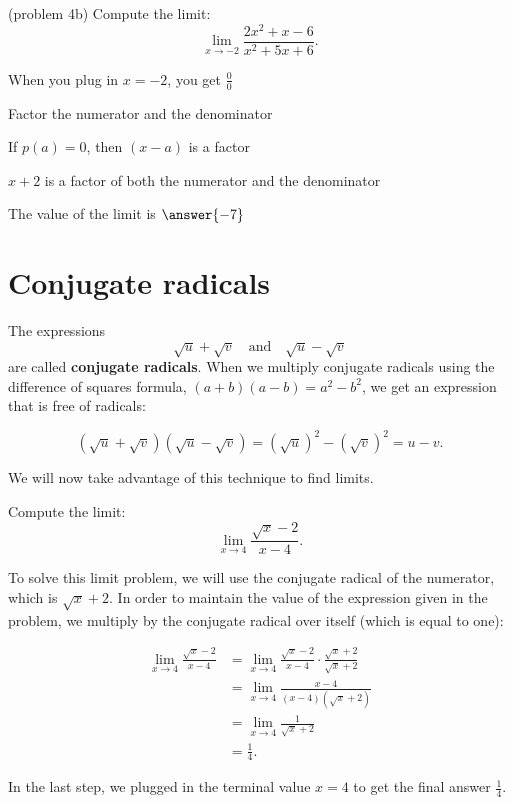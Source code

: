 \documentclass[handout]{ximera}
\begin{document}
\begin{problem}(problem 4b)
  Compute the limit:
  \[
  \lim_{x \to -2} \frac{2x^2 + x - 6}{x^2 + 5x + 6}.
  \]
  
    \begin{hint}
      When you plug in $x = -2$, you get $\frac00$
    \end{hint}
    \begin{hint}
      Factor the numerator and the denominator
    \end{hint}
    \begin{hint}
      If $p(a) = 0$, then $(x-a)$ is a factor
    \end{hint}
    \begin{hint}
      $x+2$ is a factor of both the numerator and the denominator
    \end{hint}
    
		The value of the limit is
		 $\answer{-7}$
		
\end{problem}


\section{Conjugate radicals}


The expressions 
\[\sqrt u + \sqrt v \quad \text{and} \quad \sqrt u - \sqrt v\]
 are called
\textbf{conjugate radicals}. When we multiply conjugate radicals
using the difference of squares formula, $(a+b)(a-b) = a^2 - b^2$,
we get an expression that is free of radicals: 

\[(\sqrt u + \sqrt v)(\sqrt u - \sqrt v) = (\sqrt u)^2 - (\sqrt v)^2 = u - v.\]

We will now take advantage of this technique to find limits.

\begin{example}[example 5]
Compute the limit:
\[\lim_{x \to 4} \frac{\sqrt{x} - 2}{x-4}.\]

To solve this limit problem, we will use the conjugate radical of the
numerator, which is $\sqrt{x} + 2$.  In order to maintain the value of
the expression given in the problem, we multiply by the conjugate radical
over itself (which is equal to one):



\begin{align*}
\lim_{x \to 4} \frac{\sqrt{x}- 2}{x-4} &=
\lim_{x \to 4} \frac{\sqrt{x} -2}{x-4}\cdot \frac{\sqrt{x} +2}{\sqrt{x}+2} \\[.4 em]
 &= \lim_{x \to 4} \frac{x-4}{(x-4)(\sqrt{x}+2)} \\[.4 em]
&= \lim_{x \to 4}\frac{1}{\sqrt{x}+2} \\[.4 em]
&= \frac 14.
\end{align*}

In the last step, we plugged in the terminal value $x=4$ to get the final answer $\frac14$.

\end{example}
\end{document}
